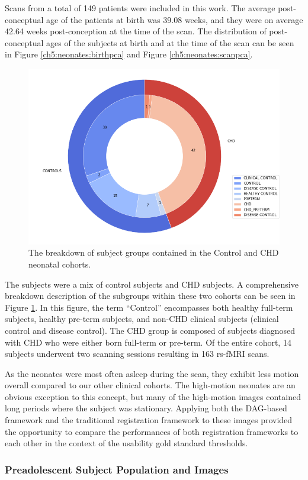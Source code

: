Scans from a total of 149 patients were included in this work. The average post-conceptual age of the patients at birth was 39.08 weeks, and they were on average 42.64 weeks post-conception at the time of the scan. The distribution of post-conceptual ages of the subjects at birth and at the time of the scan can be seen in Figure \ref{ch5:neonates:birthpca} and Figure \ref{ch5:neonates:scanpca}. 

\begin{figure}
\centering
\includegraphics[width=.6\textwidth]{5/demo_neonate_subj_cohort.png}
\caption{The breakdown of subject groups contained in the Control and CHD neonatal cohorts.}
\label{ch5:neonates:cohorts}
\end{figure}

The subjects were a mix of control subjects and CHD subjects. A comprehensive breakdown description of the subgroups within these two cohorts can be seen in Figure \ref{ch5:neonates:cohorts}. In this figure, the term ``Control'' encompasses both healthy full-term subjects, healthy pre-term subjects, and non-CHD clinical subjects (clinical control and disease control). The CHD group is composed of subjects diagnosed with CHD who were either born full-term or pre-term. Of the entire cohort, 14 subjects underwent two scanning sessions resulting in 163 rs-fMRI scans.

As the neonates were most often asleep during the scan, they exhibit less motion overall compared to our other clinical cohorts. The high-motion neonates are an obvious exception to this concept, but many of the high-motion images contained long periods where the subject was stationary. Applying both the DAG-based framework and the traditional registration framework to these images provided the opportunity to compare the performances of both registration frameworks to each other in the context of the usability gold standard thresholds. 

\subsubsection{Preadolescent Subject Population and Images}

